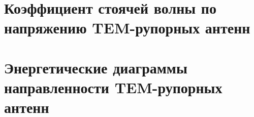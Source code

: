 %





    

	
    
	

	

	
	
	
	
    
    
    

	\chapter{Коэффициент стоячей волны по напряжению TEM-рупорных антенн}
	
	
	

    \chapter{Энергетические диаграммы направленности TEM-рупорных антенн}
    
	
	

	
	


